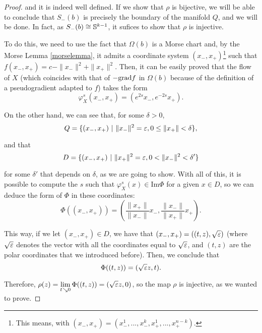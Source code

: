 \begin{proof}
and it is indeed well defined. If we show that $\rho$ is bijective, we will be able to conclude that $S_-(b)$ is precisely the boundary of the manifold $Q$, and we will be done. In fact, as $S_-(b) \cong \mathbb{S}^{k-1}$, it sufices to show that $\rho$ is injective.

To do this, we need to use the fact that $\Omega(b)$ is a Morse chart and, by the Morse Lemma \ref{morselemma}, it admits a coordinate system $(x_-,x_+)$\footnote{This means, with $(x_-,x_+)=(x_-^1,...,x_-^k,x_+^1,...,x_+^{n-k})$.} such that $f(x_-,x_+) = c - \|x_-\|^2 + \|x_+\|^2$. Then, it can be easily proved that the flow of $X$ (which coincides with that of $-\text{grad} f$ in $\Omega(b)$ because of the definition of a pseudogradient adapted to $f$) takes the form
$$\varphi_X^s(x_-,x_+) = (e^{2s}x_-,e^{-2s}x_+) .$$

On the other hand, we can see that, for some $\delta > 0$,
$$Q = \{(x_-,x_+) \ | \ \|x_-\|^2 = \varepsilon, 0 \leq \|x_+\| < \delta\}, $$

and that
$$D = \{(x_-,x_+) \ | \ \|x_+\|^2 = \varepsilon, 0 < \|x_-\|^2 < \delta' \}$$

for some $\delta'$ that depends on $\delta$, as we are going to show. With all of this, it is possible to compute the $s$ such that $\varphi_X^s(x) \in \text{Im}\Phi$ for a given $x \in D$, so we can deduce the form of $\Phi$ in these coordinates:
\[\Phi((x_-,x_+)) = \left(\frac{\|x_+\|}{\|x_-\|} x_-, \frac{\|x_-\|}{\|x_+\|} x_+\right) .\]

This way, if we let $(x_-,x_+) \in D$, we have that $(x_-,x_+) = ((t,z), \sqrt{\varepsilon})$ (where $\sqrt{\varepsilon}$ denotes the vector with all the coordinates equal to $\sqrt{\varepsilon}$, and $(t,z)$ are the polar coordinates that we introduced before). Then, we conclude that
\[\Phi((t,z)) = (\sqrt{\varepsilon} z, t) .\]

Therefore, $\rho(z) = \displaystyle\lim_{t \searrow 0} \Phi((t,z)) = (\sqrt{\varepsilon} z, 0)$, so the map $\rho$ is injective, as we wanted to prove.
\end{proof}
